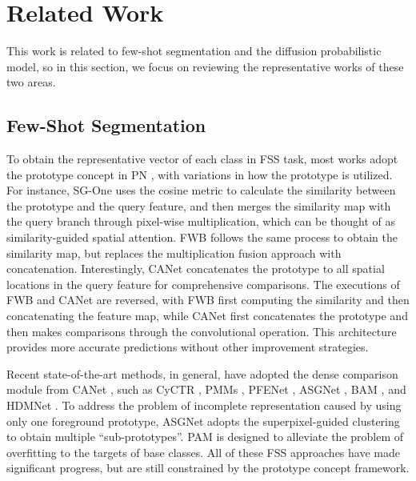 \documentclass[sigconf]{acmart}
\begin{document}
\section{Related Work}
This work is related to few-shot segmentation and the diffusion probabilistic model, so in this section, we focus on reviewing the representative works of these two areas.

\subsection{Few-Shot Segmentation}
To obtain the representative vector of each class in FSS task, most works adopt the prototype concept in PN \cite{ppn}, with variations in how the prototype is utilized. For instance, SG-One \cite{sgone} uses the cosine metric to calculate the similarity between the prototype and the query feature, and then merges the similarity map with the query branch through pixel-wise multiplication, which can be thought of as similarity-guided spatial attention. FWB \cite{fwbnet} follows the same process to obtain the similarity map, but replaces the multiplication fusion approach with concatenation. Interestingly, CANet \cite{canet} concatenates the prototype to all spatial locations in the query feature for comprehensive comparisons. The executions of FWB \cite{fwbnet} and CANet \cite{canet} are reversed, with FWB first computing the similarity and then concatenating the feature map, while CANet first concatenates the prototype and then makes comparisons through the convolutional operation. This architecture provides more accurate predictions without other improvement strategies.

Recent state-of-the-art methods, in general, have adopted the dense comparison module from CANet \cite{canet}, such as CyCTR \cite{CyCTR2021}, PMMs \cite{pmm}, PFENet \cite{pfenet}, ASGNet \cite{Li2021AdaptivePL}, BAM \cite{BAM2022}, and HDMNet \cite{HDMNet2023}. To address the problem of incomplete representation caused by using only one foreground prototype, ASGNet adopts the superpixel-guided clustering to obtain multiple ``sub-prototypes''. PAM \cite{cheng2022holistic} is designed to alleviate the problem of overfitting to the targets of base classes. All of these FSS approaches have made significant progress, but are still constrained by the prototype concept framework.
\end{document}
